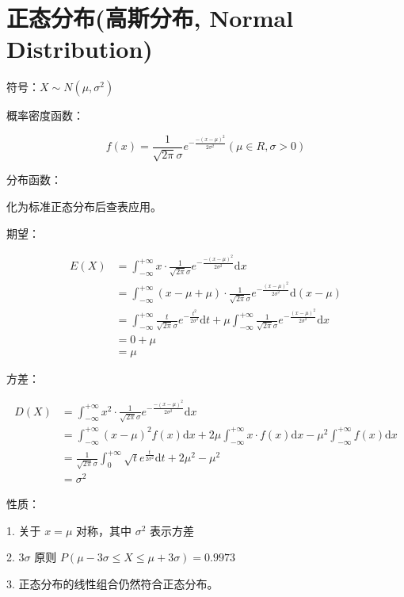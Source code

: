 \documentclass[12pt, a4paper, oneside]{ctexbook}
\begin{document}
\section{正态分布(高斯分布, Normal Distribution)}

 符号：$X\sim N(\mu, \sigma^{2})$

 概率密度函数：

$$
f(x) = \dfrac{1}{\sqrt{2\pi} \sigma}e^{-\frac{-(x-\mu)^{2}}{2\sigma^{2}}}(\mu \in R, \sigma > 0)
$$

 分布函数：

化为标准正态分布后查表应用。

 期望：

$$
\begin{aligned}
E(X) &= \int_{-\infty}^{+\infty} x \cdot \frac{1}{\sqrt{2 \pi} \sigma}e^{-\frac{-(x-\mu)^{2}}{2\sigma^{2}}} \mathrm{d}x \\
&=\int_{-\infty}^{+\infty}(x - \mu + \mu) \cdot \frac{1}{\sqrt{2\pi}\sigma}e^{-\frac{(x - \mu)^{2}}{2\sigma^{2}}} \mathrm{d}(x - \mu)\\
&= \int_{-\infty}^{+\infty} \frac{t}{\sqrt{2\pi}\sigma}e^{-\frac{t^{2}}{2\sigma^{2}}} \mathrm{d}t + \mu \int_{-\infty}^{+\infty}\frac{1}{\sqrt{2\pi}\sigma} e^{-\frac{(x - \mu)^{2}}{2\sigma^{2}}} \mathrm{d}x \\
&= 0 + \mu \\
&= \mu
\end{aligned}
$$

 方差：

$$
\begin{aligned}
D(X) &= \int_{-\infty}^{+\infty} x^{2} \cdot \frac{1}{\sqrt{2 \pi} \sigma}e^{-\frac{-(x-\mu)^{2}}{2\sigma^{2}}} \mathrm{d}x \\
&= \int_{-\infty}^{+\infty}(x - \mu)^{2} f(x) \mathrm{d}x + 2\mu \int_{-\infty}^{+\infty}x \cdot f(x) \mathrm{d}x - \mu^{2} \int_{-\infty}^{+\infty} f(x)\mathrm{d}x \\
&= \frac{1}{\sqrt{2\pi} \sigma}\int_{0}^{+\infty} \sqrt{t}e^{\frac{t}{2\sigma^{2}}} \mathrm{d}t + 2\mu^{2} - \mu^{2}\\
&= \sigma^{2}
\end{aligned}
$$

 性质：

1. 关于 $x = \mu$ 对称，其中 $\sigma^{2}$ 表示方差

2. $3\sigma$ 原则
   $P(\mu - 3\sigma \leq X \leq \mu + 3\sigma) = 0.9973$
   
3. 正态分布的线性组合仍然符合正态分布。
\end{document}
